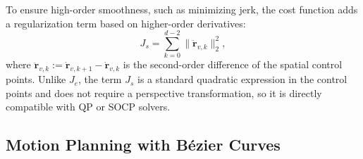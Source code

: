 To ensure high-order smoothness, such as minimizing jerk, the cost function adds a
regularization term based on higher-order derivatives:
\begin{equation}
  J_s = \sum_{k=0}^{d-2} \|\ddot{\mathbf{r}}_{v,k}\|_2^2,
  \label{eq:smooth_cost}
\end{equation}
where $\ddot{\mathbf{r}}_{v,k} := \dot{\mathbf{r}}_{v,k+1} - \dot{\mathbf{r}}_{v,k}$
is the second-order difference of the spatial control points.
Unlike $J_e$, the term $J_s$ is a standard quadratic expression in the control
points and does not require a perspective transformation, so it is directly
compatible with QP or SOCP solvers.

% 

%
\subsection{Motion Planning with Bézier Curves}

% 

